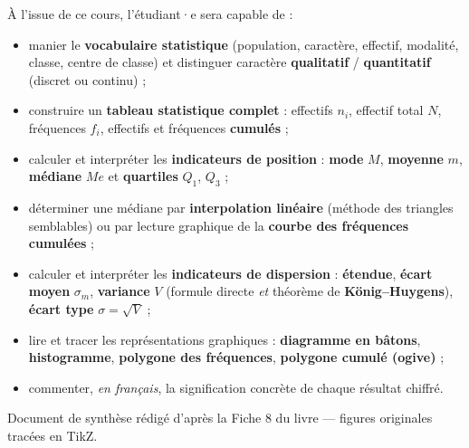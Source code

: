 \documentclass[11pt,a4paper]{article}
\newcommand{\ecm}{\sigma_m}              %
\newcommand{\ect}{\sigma}                %
\newcommand{\med}{M\!e}                  %
\begin{document}
\vfill

\begin{tcolorbox}[boxbase,colback=primary!5,colframe=primary,width=15cm,
    title={\textsc{Objectifs pédagogiques de la fiche}}]
À l'issue de ce cours, l'étudiant·e sera capable de :
\begin{itemize}[leftmargin=1.6em,topsep=2pt,itemsep=1pt]
  \item manier le \textbf{vocabulaire statistique} (population, caractère, effectif, modalité,
        classe, centre de classe) et distinguer caractère \textbf{qualitatif} / \textbf{quantitatif}
        (discret ou continu) ;
  \item construire un \textbf{tableau statistique complet} : effectifs $n_i$, effectif total $N$,
        fréquences $f_i$, effectifs et fréquences \textbf{cumulés} ;
  \item calculer et interpréter les \textbf{indicateurs de position} : \textbf{mode} $M$,
        \textbf{moyenne} $m$, \textbf{médiane} $\med$ et \textbf{quartiles} $Q_1$, $Q_3$ ;
  \item déterminer une médiane par \textbf{interpolation linéaire} (méthode des triangles semblables)
        ou par lecture graphique de la \textbf{courbe des fréquences cumulées} ;
  \item calculer et interpréter les \textbf{indicateurs de dispersion} : \textbf{étendue},
        \textbf{écart moyen} $\ecm$, \textbf{variance} $V$ (formule directe \emph{et} théorème de
        \textbf{König--Huygens}), \textbf{écart type} $\ect=\sqrt{V}$ ;
  \item lire et tracer les représentations graphiques : \textbf{diagramme en bâtons},
        \textbf{histogramme}, \textbf{polygone des fréquences}, \textbf{polygone cumulé (ogive)} ;
  \item commenter, \emph{en français}, la signification concrète de chaque résultat chiffré.
\end{itemize}
\end{tcolorbox}

\vspace{0.5cm}
{\small\color{black!60} Document de synthèse rédigé d'après la Fiche 8 du livre — figures originales tracées en TikZ.}
\par
\endgroup

\newpage
\renewcommand{\contentsname}{\textcolor{primarydark}{Table des matières}}
\tableofcontents
\thispagestyle{fancy}
\newpage
\end{document}

